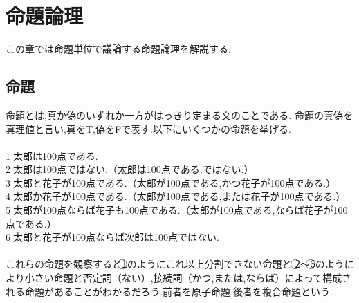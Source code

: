 \documentclass[10pt,b5paper,papersize,dvipdfmx]{jsbook}
\begin{document}
\section{命題論理}
この章では命題単位で議論する命題論理を解説する.
\subsection{命題}
命題とは,真か偽のいずれか一方がはっきり定まる文のことである.
命題の真偽を真理値と言い,真をT,偽をFで表す.以下にいくつかの命題を挙げる.\\
\\
\textcircled{\scriptsize 1}太郎は100点である.\\
\textcircled{\scriptsize 2}太郎は100点ではない.（太郎は100点である,ではない.）\\
\textcircled{\scriptsize 3}太郎と花子が100点である.（太郎が100点である,かつ花子が100点である.）\\
\textcircled{\scriptsize 4}太郎か花子が100点である.（太郎が100点である,または花子が100点である.）\\
\textcircled{\scriptsize 5}太郎が100点ならば花子も100点である.（太郎が100点である,ならば花子が100点である.）\\
\textcircled{\scriptsize 6}太郎と花子が100点ならば次郎は100点ではない.\\
\\
これらの命題を観察すると\textcircled{\scriptsize 1}のようにこれ以上分割できない命題と
\textcircled{\scriptsize 2}～\textcircled{\scriptsize 6}のようにより小さい命題と否定詞（ない）,接続詞（かつ,または,ならば）によって構成される命題があることがわかるだろう.前者を原子命題,後者を複合命題という.
\end{document}

